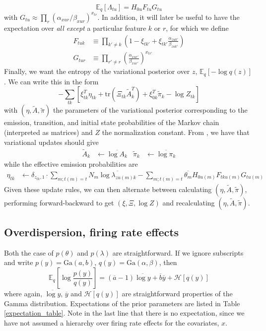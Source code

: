 \documentclass[10pt,letterpaper]{article}
\begin{document}
\begin{equation}
    \label{HFG}
    \mathbb{E}_q[\Lambda_{tu}] = H_{0u} F_{tu} G_{tu}
\end{equation}
with $G_{tu} \approx \prod_r (\alpha_{xur}/\beta_{xur})^{x_{tr}}$. In addition, it will later be useful to have the expectation over \emph{all except} a particular feature $k$ or $r$, for which we define
\begin{align}
    \label{F}
    F_{tuk} &\equiv \prod_{k'\neq k} \left(1 - \xi_{tk'} + \xi_{tk'} \frac{\alpha_{zuk'}}{\beta_{zuk'}} \right) \\
    \label{G}
    G_{tur} &\equiv \prod_{r' \neq r} \left(\frac{\alpha_{xur'}}{\beta_{xur'}} \right)^{x_{tr'}}
\end{align}
Finally, we want the entropy of the variational posterior over $z$, $\mathbb{E}_q[-\log q(z)]$. We can write this in the form
\begin{equation}
    -\sum_{tk} \left[
        \xi_{tk}^T\eta_{tk} + \text{tr}\left(\Xi_{tk} \tilde{A}_k^T \right)
        + \xi_{0k}^T\tilde{\pi}_k
        - \log Z_{tk}
    \right]
\end{equation}
with $(\eta, \tilde{A}, \tilde{\pi})$ the parameters of the variational posterior corresponding to the emission, transition, and initial state probabilities of the Markov chain (interpreted as matrices) and $Z$ the normalization constant. From \cite{beal2003variational}, we have that variational updates should give
\begin{align}
    \tilde{A}_k &\leftarrow \overline{\log A_k} &
    \tilde{\pi}_k &\leftarrow \overline{\log \pi_k}
\end{align}
while the effective emission probabilities are
\begin{align}
    \eta_{tk} &\leftarrow \delta_{z_{tk}, 1}\cdot \sum_{m; t(m) = t} N_m \overline{\log \lambda_{zu(m)k}} - \sum_{m; t(m) = t} \overline{\theta_m} H_{0u(m)} F_{tku(m)} G_{tu(m)}
\end{align}
Given these update rules, we can then alternate between calculating $(\eta, \tilde{A}, \tilde{\pi})$, performing forward-backward to get $(\xi, \Xi, \log Z)$ and recalculating $(\eta, \tilde{A}, \tilde{\pi})$.

\subsection{Overdispersion, firing rate effects}
Both the case of $p(\theta)$ and $p(\lambda)$ are straightforward. If we ignore subscripts and write $p(y) = \text{Ga}(a, b)$, $q(y) = \text{Ga}(\alpha, \beta)$, then
\begin{equation}
    \mathbb{E}_q \left[\log \frac{p(y)}{q(y)} \right] =
    (\overline{a} - 1) \overline{\log y} + \overline{b} \overline{y} + \mathcal{H}[q(y)]
\end{equation}
where again, $\overline{\log y}$, $\overline{y}$ and $\mathcal{H}[q(y)]$ are straightforward properties of the Gamma distribution. Expectations of the prior parameters are listed in Table \ref{expectation_table}. Note in the last line that there is no expectation, since we have not assumed a hierarchy over firing rate effects for the covariates, $x$.
\end{document}
